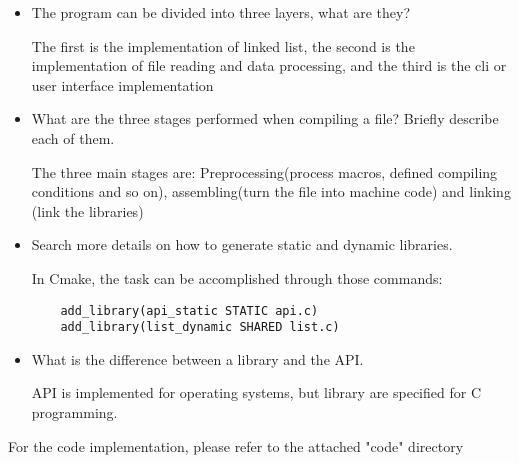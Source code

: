 \documentclass{article}
\begin{document}
\begin{itemize}
\item The program can be divided into three layers, what are they?

The first is the implementation of linked list, the second is the implementation of file reading and data processing, and the third is the cli or user interface implementation

\item What are the three stages performed when compiling a file? Briefly describe each of them.

The three main stages are: Preprocessing(process macros, defined compiling conditions and so on), assembling(turn the file into machine code) and linking (link the libraries)

\item Search more details on how to generate static and dynamic libraries.

In Cmake, the task can be accomplished through those commands: 

\begin{lstlisting}
    add_library(api_static STATIC api.c)
    add_library(list_dynamic SHARED list.c)
\end{lstlisting}

\item What is the difference between a library and the API.

API is implemented for operating systems, but library are specified for C programming.
\end{itemize}

For the code implementation, please refer to the attached "code" directory
\end{document}
